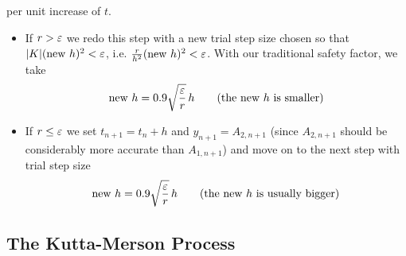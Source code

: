 per unit increase of $t$.
\begin{itemize}
\item
If $r>\varepsilon$ we redo this step with a new trial step size chosen so that 
$|K|(\text{new }h)^2<\varepsilon$, i.e. $\frac{r}{h^2}(\text{new }h)^2<\varepsilon$. 
With our traditional safety factor, we take
\begin{equation*}
\text{new }h=0.9\sqrt{\frac{\varepsilon}{r}}\,h\qquad
\text{(the new $h$ is smaller)}
\end{equation*}
\item
If $r\le \varepsilon$ we set $t_{n+1}=t_n+h$ and $y_{n+1}=A_{2,n+1}$ (since 
$A_{2,n+1}$ should be considerably more accurate than $A_{1,n+1}$) 
and move on to the next step with trial step size 
\begin{equation*}
\text{new }h=0.9\sqrt{\frac{\varepsilon}{r}}\,h\qquad
\text{(the new $h$ is usually bigger)}
\end{equation*}
\end{itemize}
\subsection{The Kutta-Merson Process}

